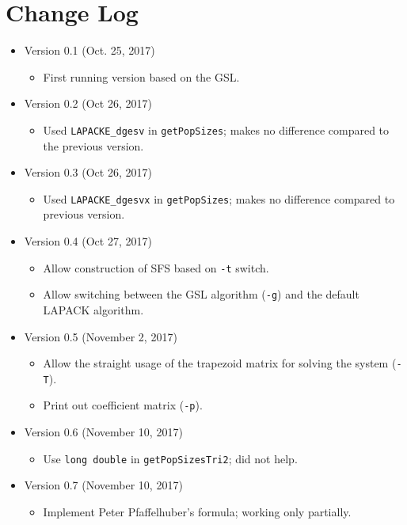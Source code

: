 \documentclass[a4paper]{article}
\newcommand{\ty}{\texttt}
\begin{document}
\section{Change Log}
\begin{itemize}
\item Version 0.1 (Oct. 25, 2017)
  \begin{itemize}
  \item First running version based on the GSL.
  \end{itemize}
\item Version 0.2 (Oct 26, 2017)
  \begin{itemize}
    \item Used \ty{LAPACKE\_dgesv} in \ty{getPopSizes}; makes no
      difference compared to the previous version.
  \end{itemize}
\item Version 0.3 (Oct 26, 2017)
  \begin{itemize}
    \item Used \ty{LAPACKE\_dgesvx} in \ty{getPopSizes}; makes no
      difference compared to previous version.
  \end{itemize}
\item Version 0.4 (Oct 27, 2017)
  \begin{itemize}
  \item Allow construction of SFS based on \ty{-t} switch.
  \item Allow switching between the GSL algorithm (\ty{-g}) and the
    default LAPACK algorithm. 
  \end{itemize}
\item Version 0.5 (November 2, 2017)
  \begin{itemize}
    \item Allow the straight usage of the trapezoid matrix for solving
      the system (\ty{-T}).
    \item Print out coefficient matrix (\ty{-p}).
  \end{itemize}
\item Version 0.6 (November 10, 2017)
  \begin{itemize}
  \item Use \ty{long double} in \ty{getPopSizesTri2}; did not help.
  \end{itemize}
\item Version 0.7 (November 10, 2017)
  \begin{itemize}
    \item Implement Peter Pfaffelhuber's formula; working only partially.
  \end{itemize}

\end{itemize}
\end{document}
